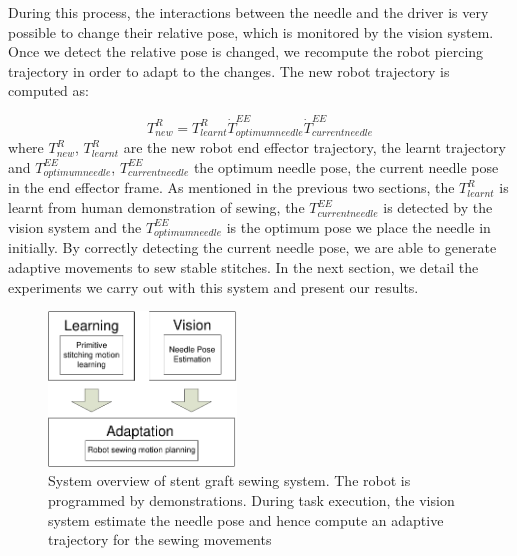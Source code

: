 During this process, the interactions between the needle and the driver is very possible to change their relative pose, which is monitored by the vision system. Once we detect the relative pose is changed, we recompute the robot piercing trajectory in order to adapt to the changes. The new robot trajectory is computed as:

\begin{equation}
{
T_{new}^R = T_{learnt}^R \dot T_{optimum needle}^{EE} \dot T_{current needle}^{EE}
}
\end{equation}
where $T_{new}^R$, $T_{learnt}^R$ are the new robot end effector trajectory, the learnt trajectory and $T_{optimum needle}^{EE}$, $T_{current needle}^{EE}$ the optimum needle pose, the current needle pose  in the end effector frame. As mentioned in the previous two sections, the $T_{learnt}^R$ is learnt from human demonstration of sewing, the $T_{current needle}^{EE}$ is detected by the vision system and the $T_{optimum needle}^{EE}$ is the optimum pose we place the needle in initially. By correctly detecting the current needle pose, we are able to generate adaptive movements to sew stable stitches. In the next section, we detail the experiments we carry out with this system and present our results.



\begin{figure}
\centering
{
\includegraphics[width=5cm]{./fig/overview_single.pdf}
\caption{{System overview of stent graft sewing system. The robot is programmed by demonstrations. During task execution, the vision system estimate the needle pose and hence compute an adaptive trajectory for the sewing movements}}

\label{fig:overview}}

\end{figure}






